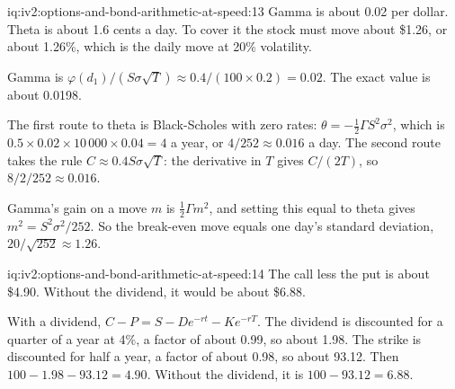 \begin{solution}{iq:iv2:options-and-bond-arithmetic-at-speed:13}
Gamma is about 0.02 per dollar. Theta is about 1.6 cents a day. To cover it the stock must move about \$1.26, or about 1.26\%, which is the daily move at 20\% volatility.

Gamma is $\varphi(d_1)/(S\sigma\sqrt T) \approx 0.4/(100 \times 0.2) = 0.02$. The exact value is about 0.0198.

The first route to theta is Black-Scholes with zero rates: $\theta = -\tfrac12\Gamma S^2\sigma^2$, which is $0.5 \times 0.02 \times 10\,000 \times 0.04 = 4$ a year, or $4/252 \approx 0.016$ a day. The second route takes the rule $C \approx 0.4S\sigma\sqrt T$: the derivative in $T$ gives $C/(2T)$, so $8/2/252 \approx 0.016$.

Gamma's gain on a move $m$ is $\tfrac12\Gamma m^2$, and setting this equal to theta gives $m^2 = S^2\sigma^2/252$. So the break-even move equals one day's standard deviation, $20/\sqrt{252} \approx 1.26$.

\end{solution}

\begin{solution}{iq:iv2:options-and-bond-arithmetic-at-speed:14}
The call less the put is about \$4.90. Without the dividend, it would be about \$6.88.

With a dividend, $C - P = S - De^{-rt} - Ke^{-rT}$. The dividend is discounted for a quarter of a year at 4\%, a factor of about 0.99, so about 1.98. The strike is discounted for half a year, a factor of about 0.98, so about 93.12. Then $100 - 1.98 - 93.12 = 4.90$. Without the dividend, it is $100 - 93.12 = 6.88$.

\end{solution}

